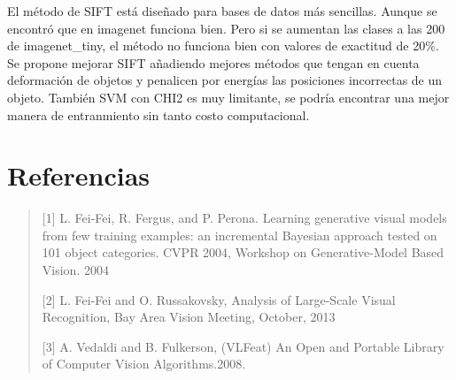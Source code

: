 \documentclass[10pt,twocolumn,letterpaper]{article}
\begin{document}
El método de SIFT está diseñado para bases de datos más sencillas. Aunque se encontró que en imagenet funciona bien. Pero si se aumentan las clases a las 200 de imagenet\_tiny, el método no funciona bien con valores de exactitud de 20\%. Se propone mejorar SIFT añadiendo mejores métodos que tengan en cuenta deformación de objetos y penalicen por energías las posiciones incorrectas de un objeto. También SVM con CHI2 es muy limitante, se podría encontrar una mejor manera de entranmiento sin tanto costo computacional. 

\section{Referencias}

\begin{quote}
   
[1] L. Fei-Fei, R. Fergus, and P. Perona.  Learning generative visual models from few training examples: an incremental Bayesian approach tested on 101 object categories. CVPR 2004, Workshop on Generative-Model Based Vision. 2004
   
   [2] L. Fei-Fei and O. Russakovsky, Analysis of Large-Scale Visual Recognition, Bay Area Vision Meeting, October, 2013
   
   [3] A. Vedaldi and B. Fulkerson, (VLFeat)\: An Open and Portable Library of Computer Vision Algorithms.2008. 
    
   
\end{quote}

{\small


}
\end{document}
